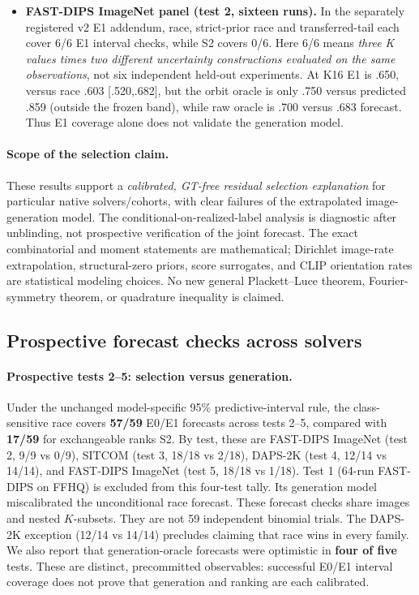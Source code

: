 \begin{itemize}
covers only 17/28 overall; DAPS-2K does \emph{not} establish a
race-over-S2 coverage advantage.
\item \textbf{FAST-DIPS ImageNet panel (test 2, sixteen runs).}
In the separately registered v2 E1 addendum, race, strict-prior
race and transferred-tail each cover 6/6 E1 interval checks,
while S2 covers 0/6. Here 6/6 means \emph{three K values times
two different uncertainty constructions evaluated on the same
observations}, not six independent held-out experiments.
At K16 E1 is .650, versus race .603 [.520,.682], but the
orbit oracle is only .750 versus predicted .859 (outside the
frozen band), while raw oracle is .700 versus .683 forecast.
Thus E1 coverage alone does not validate the generation model.
\end{itemize}

\paragraph{Scope of the selection claim.}
These results support a \emph{calibrated, GT-free residual
selection explanation} for particular native solvers/cohorts,
with clear failures of the extrapolated image-generation model.
The conditional-on-realized-label analysis is diagnostic after
unblinding, not prospective verification of the joint forecast.
The exact combinatorial and moment statements are mathematical;
Dirichlet image-rate extrapolation, structural-zero priors,
score surrogates, and CLIP orientation rates are statistical
modeling choices. No new general Plackett--Luce theorem,
Fourier-symmetry theorem, or quadrature inequality is claimed.

\subsection{Prospective forecast checks across solvers}
\label{app:s3-post-registration-20261031}

\paragraph{Prospective tests 2--5: selection versus generation.}
Under the unchanged model-specific 95\% predictive-interval rule,
the class-sensitive race covers \textbf{57/59} E0/E1 forecasts
across tests 2--5, compared with \textbf{17/59}
for exchangeable ranks S2. By test, these are FAST-DIPS ImageNet (test 2,
9/9 vs 0/9), SITCOM (test 3, 18/18 vs 2/18),
DAPS-2K (test 4, 12/14 vs 14/14), and
FAST-DIPS ImageNet (test 5, 18/18 vs 1/18).
Test 1 (64-run FAST-DIPS on FFHQ) is excluded
from this four-test tally. Its generation model
miscalibrated the unconditional race forecast.
These forecast checks share images and nested $K$-subsets.
They are not 59 independent binomial trials.
The DAPS-2K exception (12/14 vs 14/14) precludes claiming
that race wins in every family. We also report
that generation-oracle forecasts were optimistic in
\textbf{four of five} tests. These are distinct,
precommitted observables: successful E0/E1 interval coverage
does not prove that generation and ranking are each calibrated.

